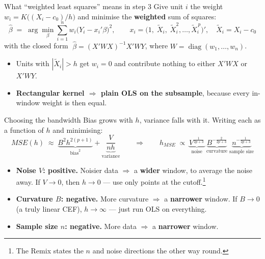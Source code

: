 \documentclass[
  11pt,
  ignorenonframetext,
  aspectratio=169,
]{beamer}
\providecommand{\tightlist}{%
  \setlength{\itemsep}{0pt}\setlength{\parskip}{0pt}}
\begin{document}
\begin{frame}{What ``weighted least squares'' means in step 3}
\protect{}\label{what-weighted-least-squares-means-in-step-3}
Give unit \(i\) the weight \(w_i = K\!\big((X_i - c_0)/h\big)\) and
minimise the \textbf{weighted} sum of squares: \[
\hat\beta \;=\; \arg\min_{\beta} \sum_{i=1}^{n} w_i \big(Y_i - x_i'\beta\big)^2 ,
\qquad x_i = \big(1,\; \tilde X_i,\; \tilde X_i^2, \ldots, \tilde X_i^{\,p}\big)', \quad \tilde X_i = X_i - c_0
\] with the closed form \(\;\hat\beta = (X'WX)^{-1}X'WY\), where
\(W = \operatorname{diag}(w_1, \ldots, w_n)\).

\begin{itemize}
\tightlist
\item
  Units with \(|\tilde X_i| > h\) get \(w_i = 0\) and contribute nothing
  to either \(X'WX\) or \(X'WY\).
\item
  \textbf{Rectangular kernel \(\Rightarrow\) plain OLS on the
  subsample}, because every in-window weight is then equal.
\end{itemize}
\end{frame}

\begin{frame}{Choosing the bandwidth}
\protect{}\label{choosing-the-bandwidth}
Bias grows with \(h\), variance falls with it. Writing each as a
function of \(h\) and minimising: \[
MSE(h) \;\approx\; \underbrace{B^2 h^{2(p+1)}}_{\text{bias}^2} + \underbrace{\frac{V}{nh}}_{\text{variance}}
\qquad\Longrightarrow\qquad
h_{MSE} \;\propto\; \underbrace{V^{\frac{1}{2p+3}}}_{\text{noise}}\;
\underbrace{B^{-\frac{2}{2p+3}}}_{\text{curvature}}\;
\underbrace{n^{-\frac{1}{2p+3}}}_{\text{sample size}}
\]

\begin{itemize}
\tightlist
\item
  \textbf{Noise \(V\): positive.} Noisier data \(\Rightarrow\) a
  \textbf{wider} window, to average the noise away. If \(V \to 0\), then
  \(h \to 0\) --- use only points at the
  cutoff.\footnote{The Remix states the $n$ and noise directions the other way round. }
\item
  \textbf{Curvature \(B\): negative.} More curvature \(\Rightarrow\) a
  \textbf{narrower} window. If \(B \to 0\) (a truly linear CEF),
  \(h \to \infty\) --- just run OLS on everything.
\item
  \textbf{Sample size \(n\): negative.} More data \(\Rightarrow\) a
  \textbf{narrower} window.
\end{itemize}
\end{frame}
\end{document}

